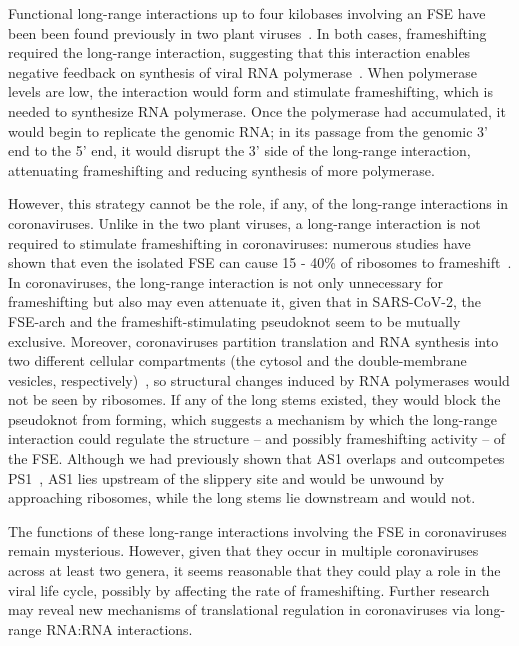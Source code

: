 \documentclass[main.tex]{subfiles}
\begin{document}
Functional long-range interactions up to four kilobases involving an FSE have been been found previously in two plant viruses~\cite{Barry2002,Tajima2011}. In both cases, frameshifting required the long-range interaction, suggesting that this interaction enables negative feedback on synthesis of viral RNA polymerase~\cite{Barry2002}. When polymerase levels are low, the interaction would form and stimulate frameshifting, which is needed to synthesize RNA polymerase. Once the polymerase had accumulated, it would begin to replicate the genomic RNA; in its passage from the genomic 3' end to the 5' end, it would disrupt the 3' side of the long-range interaction, attenuating frameshifting and reducing synthesis of more polymerase.

However, this strategy cannot be the role, if any, of the long-range interactions in coronaviruses. Unlike in the two plant viruses, a long-range interaction is not required to stimulate frameshifting in coronaviruses: numerous studies have shown that even the isolated FSE can cause 15 - 40\% of ribosomes to frameshift~\cite{Bhatt2021,Haniff2020,Kelly2020,Lan2022,Plant2010,YSun2021,KZhang2021}. In coronaviruses, the long-range interaction is not only unnecessary for frameshifting but also may even attenuate it, given that in SARS-CoV-2, the FSE-arch and the frameshift-stimulating pseudoknot seem to be mutually exclusive. Moreover, coronaviruses partition translation and RNA synthesis into two different cellular compartments (the cytosol and the double-membrane vesicles, respectively)~\cite{Wolff2020}, so structural changes induced by RNA polymerases would not be seen by ribosomes.
If any of the long stems existed, they would block the pseudoknot from forming, which suggests a mechanism by which the long-range interaction could regulate the structure -- and possibly frameshifting activity -- of the FSE.
Although we had previously shown that AS1 overlaps and outcompetes PS1~\cite{Lan2022}, AS1 lies upstream of the slippery site and would be unwound by approaching ribosomes, while the long stems lie downstream and would not.

The functions of these long-range interactions involving the FSE in coronaviruses remain mysterious. However, given that they occur in multiple coronaviruses across at least two genera, it seems reasonable that they could play a role in the viral life cycle, possibly by affecting the rate of frameshifting. Further research may reveal new mechanisms of translational regulation in coronaviruses via long-range RNA:RNA interactions.
\end{document}
